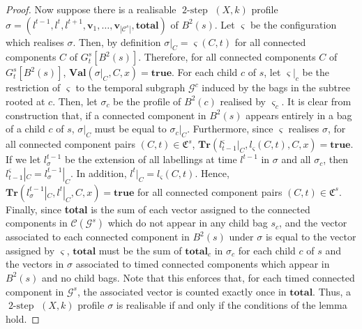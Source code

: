 \documentclass[a4paper,UKenglish,cleveref, autoref, thm-restate]{lipics-v2021} %
\DeclareMathOperator{\twostep}{2-step}
\begin{document}
\begin{toappendix}
\begin{proof}
    Now suppose there is a realisable $\twostep$ $(X,k)$ profile $\sigma=(l^{t-1}, l^t, l^{t+1}, \textbf{v}_{1},\ldots, \textbf{v}_{|\mathcal{C}^s|}, \textbf{total})$ of $B^2(s)$. Let $\varsigma$ be the configuration which realises $\sigma$. Then, by definition $\sigma|_C=\varsigma(C,t)$ for all connected components $C$ of $G^s_t[B^2(s)]$. Therefore, for all connected components $C$ of $G^s_t[B^2(s)]$, $\textbf{Val}(\sigma|_C,C,x)=\textbf{true}$. For each child $c$ of $s$, let $\varsigma|_c$ be the restriction of $\varsigma$ to the temporal subgraph $\mathcal{G}^c$ induced by the bags in the subtree rooted at $c$. Then, let $\sigma_c$ be the profile of $B^2(c)$ realised by $\varsigma_c$. 
     It is clear from construction that, if a connected component in $B^2(s)$ appears entirely in a bag of a child $c$ of $s$, $\sigma|_C$ must be equal to $\sigma_c|_C$. Furthermore, since $\varsigma$ realises $\sigma$, for all connected component pairs $(C,t)\in\mathfrak{C}^s$, $\textbf{Tr}(l^{\varsigma}_{t-1}|_C, l_{\varsigma}(C,t),C,x)=\textbf{true}$. If we let $l^{t-1}_{\sigma}$ be the extension of all labellings at time $l^{t-1}$ in $\sigma$ and all $\sigma_c$, then $l^{\varsigma}_{t-1}|_C=l^{t-1}_{\sigma}|_C$. In addition, $l^t|_C=l_{\varsigma}(C,t)$. Hence, $\textbf{Tr}(l^{t-1}_{\sigma}|_C, l^t|_C,C,x)=\textbf{true}$ for all connected component pairs $(C,t)\in\mathfrak{C}^s$. Finally, since \textbf{total} is the sum of each vector assigned to the connected components in $\mathcal{C}(\mathcal{G}^s)$ which do not appear in any child bag $s_c$, and the vector associated to each connected component in $B^2(s)$ under $\sigma$ is equal to the vector assigned by $\varsigma$, $\textbf{total}$ must be the sum of $\textbf{total}_c$ in $\sigma_c$ for each child $c$ of $s$ and the vectors in $\sigma$ associated to timed connected components which appear in $B^2(s)$ and no child bags. Note that this enforces that, for each timed connected component in $\mathcal{G}^s$, the associated vector is counted exactly once in $\textbf{total}$.
    Thus, a $\twostep$ $(X,k)$ profile $\sigma$ is realisable if and only if the conditions of the lemma hold.
\end{proof}


\end{toappendix}
\end{document}
